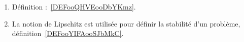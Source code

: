 
    \begin{enumerate}
    \item
        Définition :~\ref{DEFooQHVEooDbYKmz}.
    \item
        La notion de Lipschitz est utilisée pour définir la stabilité d'un problème, définition~\ref{DEFooYIFAooSJbMkC}.
    \end{enumerate}

